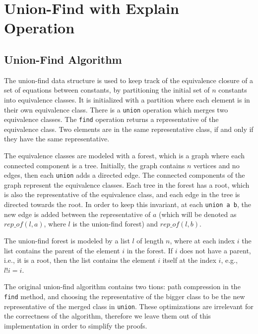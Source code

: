 
\chapter{Union-Find with Explain Operation}\label{chapter:union_find}

\section{Union-Find Algorithm}
\label{section:uf-algorithm}

The union-find data structure is used to keep track of the equivalence closure of a set of equations between constants,  by partitioning the initial set of $n$ constants into equivalence classes. It is initialized with a partition where each element is in their own equivalence class. There is a \lstinline{union} operation which merges two equivalence classes. The \lstinline{find} operation returns a representative of the equivalence class. Two elements are in the same representative class, if and only if they have the same representative.

The equivalence classes are modeled with a forest, which is a graph where each connected component is a tree. Initially, the graph contains $n$ vertices and no edges, then each \lstinline{union} adds a directed edge. The connected components of the graph represent the equivalence classes. Each tree in the forest has a root, which is also the representative of the equivalence class, and each edge in the tree is directed towards the root. In order to keep this invariant, at each \lstinline{union a b}, the new edge is added between the representative of $a$ (which will be denoted as $rep\_of(l, a)$, where $l$ is the union-find forest) and $rep\_of(l, b)$.

The union-find forest is modeled by a list $l$ of length $n$, where at each index $i$ the list contains the parent of the element $i$ in the forest. If $i$ does not have a parent, i.e., it is a root, then the list contains the element $i$ itself at the index $i$, e.g., $l!i = i$.

The original union-find algorithm \cite{Tarjan} contains two tions: path compression in the \lstinline{find} method, and choosing the representative of the bigger class to be the new representative of the merged class in \lstinline{union}. These optimizations are irrelevant for the correctness of the algorithm, therefore we leave them out of this implementation in order to simplify the proofs.


